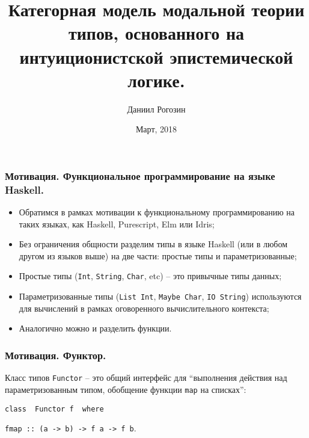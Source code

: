 \documentclass[10pt,pdf,utf8,russian,aspectratio=169]{beamer}
\title{Категорная модель модальной теории типов, основанного на интуиционистской эпистемической логике.}
\author{Даниил Рогозин}
\date{Март, 2018}
\begin{document}
\maketitle

\begin{frame}
  \frametitle{Мотивация. Функциональное программирование на языке Haskell.}
  \begin{itemize}
    \item Обратимся в рамках мотивации к функциональному программированию на таких языках, как
      Haskell, Purescript, Elm или Idris;
    \item Без ограничения общности разделим типы в языке Haskell (или в любом другом из языков выше) на две части:
    простые типы и параметризованные;
    \item Простые типы (\verb"Int", \verb"String", \verb"Char", etc) -- это привычные типы данных;
    \item Параметризованные типы (\verb"List Int", \verb"Maybe Char", \verb"IO String") используются для
    вычислений в рамках оговоренного вычислительного контекста;
    \item Аналогично можно и разделить функции.
  \end{itemize}
\end{frame}

\begin{frame}
\frametitle{Мотивация. Функтор.}
Класс типов \verb"Functor" -- это общий интерфейс для ``выполнения действия над параметризованным типом, обобщение функции \verb"map" на списках'':

\vspace{\baselineskip}

\verb"class  Functor f  where"

\quad\quad \verb"fmap :: (a -> b) -> f a -> f b".

\end{frame}
\end{document}

